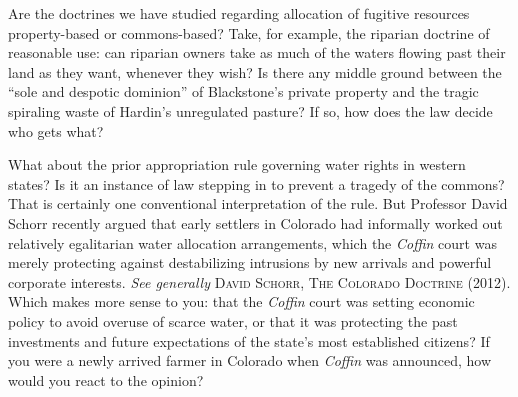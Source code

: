 \item Are the doctrines we have studied regarding allocation of fugitive
resources property-based or commons-based? Take, for example, the riparian
doctrine of reasonable use: can riparian owners take as much of the waters
flowing past their land as they want, whenever they wish? Is there any middle
ground between the ``sole and despotic dominion'' of Blackstone's private
property and the tragic spiraling waste of Hardin's unregulated pasture? If so,
how does the law decide who gets what?


What about the prior appropriation rule governing water rights in western
states? Is it an instance of law stepping in to prevent a tragedy of the
commons? That is certainly one conventional interpretation of the rule. But
Professor David Schorr recently argued that early settlers in Colorado had
informally worked out relatively egalitarian water allocation arrangements,
which the \textit{Coffin} court was merely protecting against destabilizing
intrusions by new arrivals and powerful corporate interests. \textit{See
generally} \textsc{David Schorr, The Colorado Doctrine} (2012). Which makes more
sense to you: that the \textit{Coffin} court was setting economic policy to
avoid overuse of scarce water, or that it was protecting the past investments
and future expectations of the state's most established citizens? If you were a
newly arrived farmer in Colorado when \textit{Coffin} was announced, how would
you react to the opinion?


